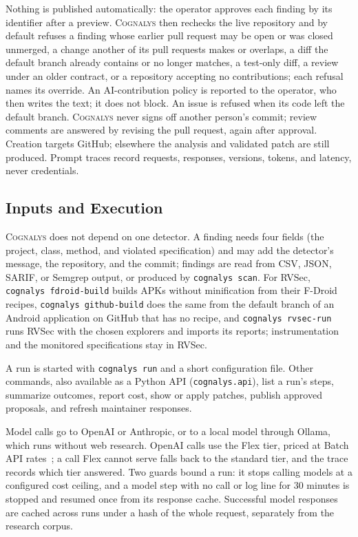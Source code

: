 \documentclass[conference]{IEEEtran}
\newcommand{\system}{\textsc{Cognalys}}
\begin{document}
Nothing is published automatically: the operator approves each finding by its
identifier after a preview. \system{} then rechecks the live repository and by
default refuses a finding whose earlier pull request may be open or was closed
unmerged, a change another of its pull requests makes or overlaps, a diff the
default branch already contains or no longer matches, a test-only diff, a
review under an older contract, or a repository accepting no contributions;
each refusal names its override. An AI-contribution policy is reported to the
operator, who then writes the text; it does not block. An issue is refused when
its code left the default branch. \system{} never signs off another person's
commit; review comments are answered by revising the pull request, again after
approval. Creation targets GitHub; elsewhere the analysis and validated patch
are still produced. Prompt traces record requests, responses, versions, tokens,
and latency, never credentials.

\subsection{Inputs and Execution}

\system{} does not depend on one detector. A finding needs four fields (the
project, class, method, and violated specification) and may add the detector's
message, the repository, and the commit; findings are read from CSV, JSON,
SARIF, or Semgrep output, or produced by \texttt{cognalys scan}. For RVSec,
\texttt{cognalys fdroid-build} builds APKs without minification from their
F-Droid recipes, \texttt{cognalys github-build} does the same from the default
branch of an Android application on GitHub that has no recipe, and
\texttt{cognalys rvsec-run} runs RVSec with the chosen explorers and imports
its reports; instrumentation and the monitored
specifications stay in RVSec.

A run is started with \texttt{cognalys run} and a short configuration file.
Other commands, also available as a Python API (\texttt{cognalys.api}), list a
run's steps, summarize outcomes, report cost, show or apply patches, publish
approved proposals, and refresh maintainer responses.

Model calls go to OpenAI or Anthropic, or to a local model through Ollama, which
runs without web research. OpenAI calls use the Flex tier, priced at Batch API
rates~\cite{openai2026flex}; a call Flex cannot serve falls back to the standard tier, and the trace
records which tier answered. Two guards bound a run: it stops calling models at
a configured cost ceiling, and a model step with no call or log line for 30
minutes is stopped and resumed once from its response cache. Successful model
responses are cached across runs under a hash of the whole request, separately
from the research corpus.
\end{document}
